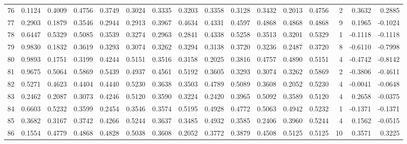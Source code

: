 \begin{tabular}{lrrrrrrrrrrrrrrr}
76  &      0.1124 &  0.4009 &  0.4756 &  0.3749 &  0.3024 &  0.3335 &  0.3203 &  0.3358 &  0.3128 &  0.3432 &   0.2013 &     0.4756 &      2 &                    0.3632 &                     0.2885 \\
77  &      0.2903 &  0.1879 &  0.3546 &  0.2944 &  0.2913 &  0.3967 &  0.4634 &  0.4331 &  0.4597 &  0.4868 &   0.4868 &     0.4868 &      9 &                    0.1965 &                    -0.1024 \\
78  &      0.6447 &  0.5329 &  0.5085 &  0.3539 &  0.3274 &  0.2963 &  0.2841 &  0.4338 &  0.5258 &  0.3513 &   0.3201 &     0.5329 &      1 &                   -0.1118 &                    -0.1118 \\
79  &      0.9830 &  0.1832 &  0.3619 &  0.3293 &  0.3074 &  0.3262 &  0.3294 &  0.3138 &  0.3720 &  0.3236 &   0.2487 &     0.3720 &      8 &                   -0.6110 &                    -0.7998 \\
80  &      0.9893 &  0.1751 &  0.3199 &  0.4244 &  0.5151 &  0.3516 &  0.3158 &  0.2025 &  0.3816 &  0.4757 &   0.4890 &     0.5151 &      4 &                   -0.4742 &                    -0.8142 \\
81  &      0.9675 &  0.5064 &  0.5869 &  0.5439 &  0.4937 &  0.4561 &  0.5192 &  0.3605 &  0.3293 &  0.3074 &   0.3262 &     0.5869 &      2 &                   -0.3806 &                    -0.4611 \\
82  &      0.5271 &  0.4623 &  0.4404 &  0.4440 &  0.5230 &  0.3638 &  0.3503 &  0.4789 &  0.5089 &  0.3608 &   0.2052 &     0.5230 &      4 &                   -0.0041 &                    -0.0648 \\
83  &      0.2462 &  0.2087 &  0.3073 &  0.4246 &  0.5120 &  0.3590 &  0.3224 &  0.2420 &  0.3965 &  0.5092 &   0.3589 &     0.5120 &      4 &                    0.2658 &                    -0.0375 \\
84  &      0.6603 &  0.5232 &  0.3599 &  0.2454 &  0.3546 &  0.3574 &  0.5195 &  0.4928 &  0.4772 &  0.5063 &   0.4942 &     0.5232 &      1 &                   -0.1371 &                    -0.1371 \\
85  &      0.3682 &  0.3167 &  0.3742 &  0.4266 &  0.5244 &  0.3637 &  0.3485 &  0.4932 &  0.3585 &  0.2406 &   0.3960 &     0.5244 &      4 &                    0.1562 &                    -0.0515 \\
86  &      0.1554 &  0.4779 &  0.4868 &  0.4828 &  0.5038 &  0.3608 &  0.2052 &  0.3772 &  0.3879 &  0.4508 &   0.5125 &     0.5125 &     10 &                    0.3571 &                     0.3225 \\

\end{tabular}
